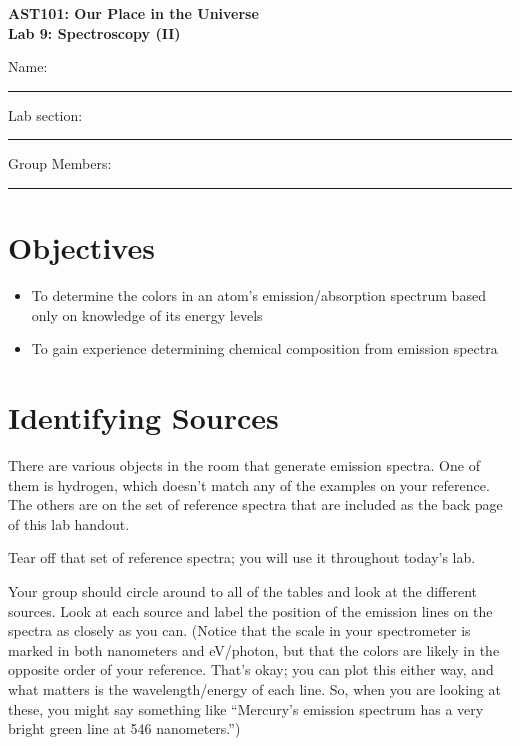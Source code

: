 \documentclass[11pt]{article}
\begin{document}
\begin{center}
\textbf{\Large
AST101: Our Place in the Universe \\
\vspace*{0.1cm}
Lab 9: Spectroscopy (II)
}

\end{center}


\vspace*{0.5cm}

{\Large Name:}\vspace*{0.5cm}\\\hrule
{\Large Lab section:}\vspace*{0.5cm}\\\hrule
{\Large Group Members:}\vspace*{0.5cm}\\\hrule
\vspace*{0.5cm}


\section{Objectives}
\begin{itemize}
	\item To determine the colors in an atom's emission/absorption spectrum based only on knowledge of its energy levels
	\item To gain experience determining chemical composition from emission spectra
\end{itemize}



\section{Identifying Sources}


There are various objects in the room that generate emission spectra. One of them is hydrogen, which doesn't match any of the examples
on your reference. The others are on the set of reference spectra that are included as the back page of this lab handout. 

{\color{red}Tear off that set of reference spectra; you will use it throughout today's lab. }

Your group should circle around to all of the tables and look at the different sources. Look at each source and label the position of 
the emission lines on the spectra as closely as you can. (Notice that the scale in your spectrometer is marked in both nanometers and eV/photon, but that the colors are likely in the opposite order of your reference. That's okay; you can plot this either way, and what matters is the wavelength/energy of each line. So, when you are looking at these, you might say something like ``Mercury's emission spectrum has a very bright green line at 546 nanometers.'') 
\end{document}
